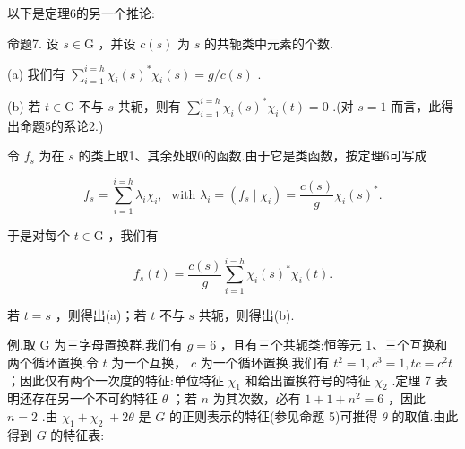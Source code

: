 以下是定理6的另一个推论:

命题7. 设 \(s \in  \mathrm{G}\) ，并设 \(c\left( s\right)\) 为 \(s\) 的共轭类中元素的个数.

(a) 我们有 \(\mathop{\sum }\limits_{{i = 1}}^{{i = h}}{\chi }_{i}{\left( s\right) }^{ * }{\chi }_{i}\left( s\right)  = g/c\left( s\right)\) .

(b) 若 \(t \in  \mathrm{G}\) 不与 \(s\) 共轭，则有 \(\mathop{\sum }\limits_{{i = 1}}^{{i = h}}{\chi }_{i}{\left( s\right) }^{ * }{\chi }_{i}\left( t\right)  = 0\) .(对 \(s = 1\) 而言，此得出命题5的系论2.)

令 \({f}_{s}\) 为在 \(s\) 的类上取1、其余处取0的函数.由于它是类函数，按定理6可写成

\[
{f}_{s} = \mathop{\sum }\limits_{{i = 1}}^{{i = h}}{\lambda }_{i}{\chi }_{i},\;\text{ with }{\lambda }_{i} = \left( {{f}_{s} \mid  {\chi }_{i}}\right)  = \frac{c\left( s\right) }{g}{\chi }_{i}{\left( s\right) }^{ * }.
\]

于是对每个 \(t \in  \mathrm{G}\) ，我们有

\[
{f}_{s}\left( t\right)  = \frac{c\left( s\right) }{g}\mathop{\sum }\limits_{{i = 1}}^{{i = h}}{\chi }_{i}{\left( s\right) }^{ * }{\chi }_{i}\left( t\right) .
\]

若 \(t = s\) ，则得出(a)；若 \(t\) 不与 \(s\) 共轭，则得出(b).

例.取 \(\mathrm{G}\) 为三字母置换群.我们有 \(g = 6\) ，且有三个共轭类:恒等元 1、三个互换和两个循环置换.令 \(t\) 为一个互换， \(c\) 为一个循环置换.我们有 \({t}^{2} = 1,{c}^{3} = 1,{tc} = {c}^{2}t\) ；因此仅有两个一次度的特征:单位特征 \({\chi }_{1}\) 和给出置换符号的特征 \({\chi }_{2}\) .定理 7 表明还存在另一个不可约特征 \(\theta\) ；若 \(n\) 为其次数，必有 \(1 + 1 + {n}^{2} = 6\) ，因此 \(n = 2\) .由 \({\chi }_{1} + {\chi }_{2} \; + {2\theta }\) 是 \(G\) 的正则表示的特征(参见命题 5)可推得 \(\theta\) 的取值.由此得到 \(G\) 的特征表:

\begin{center}
\end{center}

